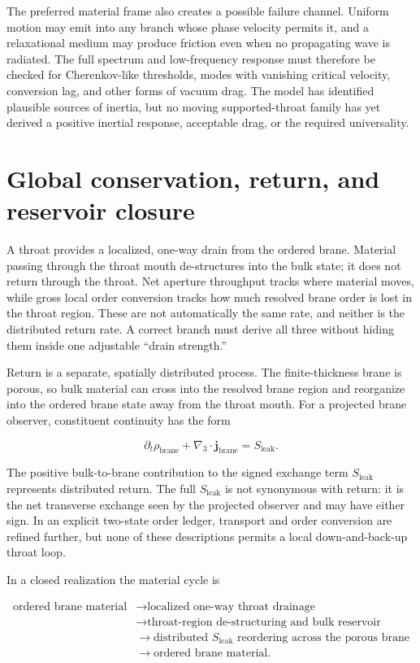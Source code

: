 The preferred material frame also creates a possible failure channel. Uniform
motion may emit into any branch whose phase velocity permits it, and a
relaxational medium may produce friction even when no propagating wave is
radiated. The full spectrum and low-frequency response must therefore be checked
for Cherenkov-like thresholds, modes with vanishing critical velocity,
conversion lag, and other forms of vacuum drag. The model has identified
plausible sources of inertia, but no moving supported-throat family has yet
derived a positive inertial response, acceptable drag, or the required
universality.

\section{Global conservation, return, and reservoir closure}

A throat provides a localized, one-way drain from the ordered brane. Material
passing through the throat mouth de-structures into the bulk state; it does not
return through the throat. Net aperture throughput tracks where material moves,
while gross local order conversion tracks how much resolved brane order is lost
in the throat region. These are not automatically the same rate, and neither is
the distributed return rate. A correct branch must derive all three without
hiding them inside one adjustable ``drain strength.''

Return is a separate, spatially distributed process. The finite-thickness brane
is porous, so bulk material can cross into the resolved brane region and
reorganize into the ordered brane state away from the throat mouth. For a
projected brane observer, constituent continuity has the form

\[
\partial_t\rho_{\mathrm{brane}}
+\nabla_3\!\cdot\!\mathbf j_{\mathrm{brane}}
=S_{\mathrm{leak}}.
\]

The positive bulk-to-brane contribution to the signed exchange term
\(S_{\mathrm{leak}}\) represents distributed return. The full
\(S_{\mathrm{leak}}\) is not synonymous with return: it is the net transverse
exchange seen by the projected observer and may have either sign. In an explicit
two-state order ledger, transport and order conversion are refined further, but
none of these descriptions permits a local down-and-back-up throat loop.

In a closed realization the material cycle is

\[
\begin{aligned}
\text{ordered brane material}
&\longrightarrow \text{localized one-way throat drainage}\\
&\longrightarrow \text{throat-region de-structuring and bulk reservoir}\\
&\longrightarrow \text{distributed }S_{\mathrm{leak}}
  \text{ reordering across the porous brane}\\
&\longrightarrow \text{ordered brane material}.
\end{aligned}
\]

